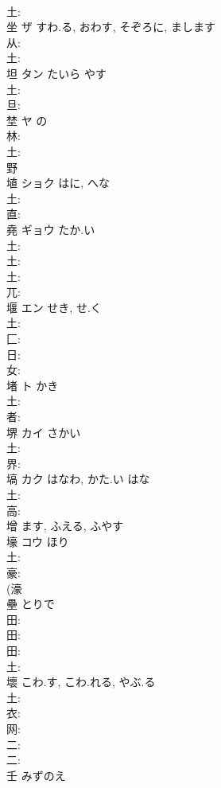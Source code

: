 \documentclass[8pt]{extreport}
\begin{document}
\begin{CJK}{UTF8}{min}
\\	土: 
\\	坐	ザ	すわ.る, おわす, そぞろに, まします		
\\	从: 
\\	土: 
\\	坦	タン	たいら	やす	
\\	土: 
\\	旦: 
\\	埜	ヤ	の				
\\	林: 
\\	土: 
\\	野 
\\	埴	ショク	はに, へな		
\\	土: 
\\	直: 
\\	堯	ギョウ	たか.い		
\\	土: 
\\	土: 
\\	土: 
\\	兀: 
\\	堰	エン	せき, せ.く		
\\	土: 
\\	匚: 
\\	日: 
\\	女: 
\\	堵	ト	かき		
\\	土: 
\\	者: 
\\	堺	カイ	さかい		
\\	土: 
\\	界: 
\\	塙	カク	はなわ, かた.い	はな	
\\	土: 
\\	高: 
\\	增		ます, ふえる, ふやす				
\\	壕	コウ	ほり		
\\	土: 
\\	豪: 
\\	(濠 
\\	壘		とりで				
\\	田: 
\\	田: 
\\	田: 
\\	土: 
\\	壞		こわ.す, こわ.れる, やぶ.る				
\\	土: 
\\	衣: 
\\	网: 
\\	二: 
\\	二: 
\\	壬		みずのえ				

\end{CJK}
\end{document}
